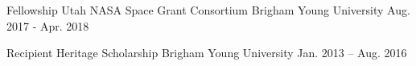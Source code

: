 

\begin{cvhonors}

\cvhonor
	{Fellowship} %
	{Utah NASA Space Grant Consortium} %
	{Brigham Young University} %
	{Aug. 2017 - Apr. 2018} %

  \cvhonor
    {Recipient} %
    {Heritage Scholarship} %
    {Brigham Young University} %
    {Jan. 2013 – Aug. 2016} %

\end{cvhonors}
